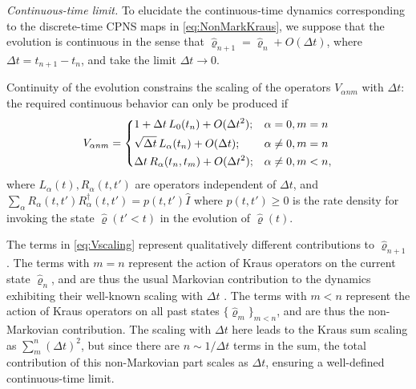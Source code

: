 \documentclass[
    11pt,
    letterpaper,
    reprint,
    notitlepage,
    superscriptaddress,
    aps,prx
]{revtex4-2}
\renewcommand{\rho}{\varrho}
\begin{document}
\emph{Continuous-time limit.}
To elucidate the continuous-time dynamics corresponding to the discrete-time CPNS maps in 
\cref{eq:NonMarkKraus}, we suppose that the evolution is continuous in the sense that 
$\hat{\rho}_{n+1} =\hat{\rho}_n + O(\Delta t)$, 
where $\Delta t = t_{n+1} - t_n$, and take the limit $\Delta t \to 0$.

Continuity of the evolution constrains the scaling of the operators $V_{\alpha nm}$ 
with $\Delta t$: the required continuous behavior can only be produced if
\begin{equation}\label{eq:Vscaling}
\begin{split}
	V_{\alpha nm} = 
	\begin{dcases}
	  1 + \Delta t\, {L}_0(t_n) + O(\Delta t^2); & \alpha = 0, m = n\\
	  \sqrt{\Delta t}\,  L_\alpha(t_n) + O(\Delta t); & \alpha \neq 0, m = n\\
	  \Delta t\, {R}_\alpha(t_n, t_m) + O(\Delta t^2); & \alpha \neq 0, m < n,
    \end{dcases}
\end{split}
\end{equation}
where ${L}_\alpha(t), {R}_\alpha(t,t')$ are operators independent of $\Delta t$,
and $\sum_\alpha R_\alpha(t, t') R^\dagger_\alpha(t, t') = p(t, t') \hat I$ where $p(t, t') \geq 0$
is the rate density for invoking the state $\hat \rho(t'<t)$ in the evolution of $\hat \rho(t)$.

The terms in \cref{eq:Vscaling} represent qualitatively different contributions 
to $\hat{\rho}_{n+1}$.
The terms with $m=n$ represent the action of Kraus operators on the
current state $\hat{\rho}_n$, and are thus the usual Markovian contribution to the dynamics
exhibiting their well-known scaling with $\Delta t$ \cite{Manzano2020}.
The terms with $m < n$ represent the action of Kraus operators on all past states 
$\{\hat{\rho}_m\}_{m < n}$, and are thus the non-Markovian contribution. 
The scaling with $\Delta t$ here leads to the
Kraus sum scaling as $\sum_m^n (\Delta t)^2$, but since there are $n \sim 1/\Delta t$ terms in the sum, 
the total contribution of this non-Markovian part scales as
$\Delta t$, ensuring a well-defined continuous-time limit.   
\end{document}
